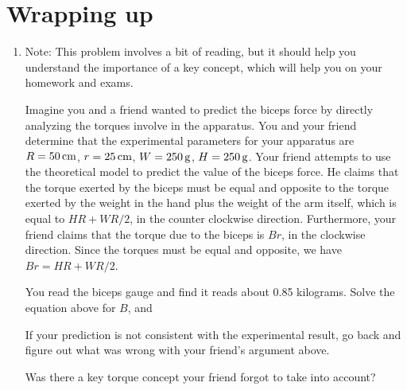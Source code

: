 \section*{Wrapping up}
\begin{enumerate}[labproc]
	\item 
		Note:  This problem involves a bit of reading,
		but it should help you understand the importance of a key
		concept, which will help you on your homework and exams.

		Imagine you and a friend wanted to predict the biceps force by 
		directly analyzing the torques involve in the apparatus.
		You and your friend determine that the experimental parameters for
		your apparatus are 
		$R=50\,\mathrm{cm}$, $r=25\,\mathrm{cm}$,
		$W=250\,\mathrm{g}$, $H=250\,\mathrm{g}$.
		Your friend attempts to use the theoretical model
		to predict the value of the biceps force.
		He claims that the torque exerted by the biceps must be equal and 
		opposite to the torque exerted by the weight in the hand
		plus the weight of the arm itself, 
		which is equal to $H R + W R/2$, in the counter clockwise direction.
		Furthermore, your friend claims that the torque due to
		the biceps is $B r$, in the clockwise direction.
		Since the torques must be equal and opposite, we have
		$Br=HR+WR/2$.

		You read the biceps gauge and find it reads about 0.85 kilograms.
		Solve the equation above for $B$, and 

		If your prediction is not consistent with the experimental result, 
		go back and figure out what was wrong with your friend's argument
		above.  

		Was there a key torque concept 
		your friend forgot to take into account?



\end{enumerate}
